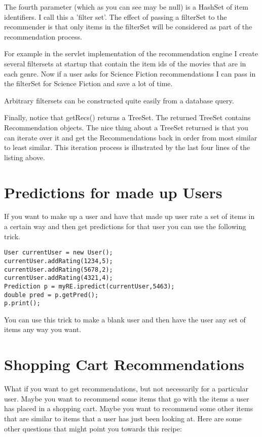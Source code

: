 \documentclass[12pt]{article}
\begin{document}
The fourth parameter (which as you can see may be null) is a HashSet
of item identifiers. I call this a  'filter set'.  The effect of
passing a filterSet to the recommender is that only items in the
filterSet will be considered as part of the recommendation process.  

For example in the servlet implementation of the recommendation engine
I create several filtersets at startup that contain the item ids of
the movies that are in each genre.  Now if a user asks for Science
Fiction recommendations I can pass in the filterSet for Science
Fiction and save a lot of time. 

Arbitrary filtersets can be constructed quite easily from a database
query.

Finally, notice that getRecs() returns a TreeSet.  The returned
TreeSet contains Recommendation objects. The nice thing about a
TreeSet returned is that you can iterate over it and get the
Recommendations back in order from most similar to least similar.
This iteration process is illustrated by the last four lines of the
listing above.

\section{Predictions for made up Users}
\label{sec:cart}
If you want to make up a user and have that made up user rate a set of
items in a certain way and then get predictions for that user you
can use the following trick.

\begin{lstlisting}
User currentUser = new User();
currentUser.addRating(1234,5);
currentUser.addRating(5678,2);
currentUser.addRating(4321,4);
Prediction p = myRE.ipredict(currentUser,5463);
double pred = p.getPred();
p.print();
\end{lstlisting}
You can use this trick to make a blank user and then have the user
any set of items any way you want.

\section{Shopping Cart Recommendations}
\label{sec:cart}

What if you want to get recommendations, but not necessarily for a
particular user. Maybe you want to recommend some items that go with
the items a user has placed in a shopping cart.  Maybe you want to
recommend some other items that are similar to items that a user has
just been looking at.  Here are some other questions that might point
you towards this recipe:
\end{document}
